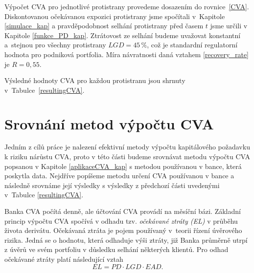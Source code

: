 \documentclass[a4paper,12pt]{report}
\theoremstyle{definition} \newtheorem{definice}[veta]{Definice}
\theoremstyle{remark}
\begin{document}
Výpočet CVA pro jednotlivé protistrany provedeme dosazením do rovnice~\eqref{CVA}. 
Diskontovanou očekávanou expozici protistrany jsme spočítali v~Kapitole \ref{simulace_kap} a pravděpodobnost selhání protistrany před časem $t$ jsme určili v Kapitole \ref{funkce_PD_kap}.
Ztrátovost ze selhání budeme uvažovat konstantní a~stejnou pro všechny protistrany $LGD=45\,\%$, což je standardní regulatorní hodnota pro podniková portfolia. 
Míra návratnosti daná vztahem \eqref{recovery_rate} je $R=0,55$.

Výsledné hodnoty CVA pro každou protistranu jsou shrnuty v~Tabulce~\ref{resultingCVA}.
\begin{table}%
  \centering 
\caption{Přehled výsledků CVA pro jednotlivé protistrany}
\label{resultingCVA}
\vspace{5mm}
\end{table}



\section{Srovnání metod výpočtu CVA}\label{srovnani_metod_cva}
Jedním z cílů práce je nalezení efektivní metody výpočtu kapitálového požadavku k riziku nárůstu CVA, proto v této části budeme srovnávat metodu výpočtu CVA popsanou v Kapitole \ref{aplikaceCVA_kap} s metodou používanou v bance, která poskytla data.
Nejdříve popíšeme metodu určení CVA používanou v bance a následně srovnáme její výsledky s výsledky z předchozí části uvedenými v~Tabulce \ref{resultingCVA}. 

Banka CVA počítá denně, ale účtování CVA provádí na měsíční bázi.
Základní princip výpočtu CVA spočívá v odhadu tzv. \textit{očekávané ztráty (EL)} v průběhu života derivátu. 
Očekávaná ztráta je pojem používaný v~teorii řízení úvěrového rizika.
Jedná se o hodnotu, která odhaduje výši ztráty, již Banka průměrně utrpí z úvěrů ve svém portfoliu v důsledku selhání některých klientů. 
Pro odhad očekávané ztráty platí následující vztah 
\begin{equation}\label{el}
EL=PD\cdot LGD\cdot EAD.
\end{equation}
\end{document}
